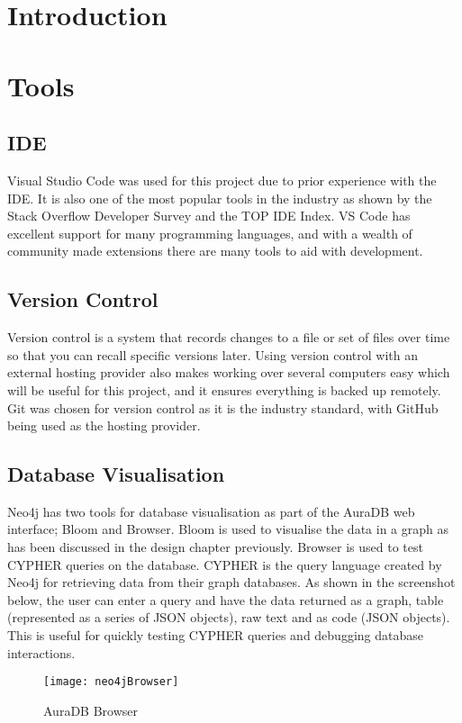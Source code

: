 \section{Introduction}
\section{Tools}
\subsection{IDE}
Visual Studio Code was used for this project due to prior experience with the IDE. It is also one of the most popular tools in the industry 
as shown by the Stack Overflow Developer Survey\cite{StackOverflowDeveloper} and the TOP IDE Index\cite{TOPIDETop}.
VS Code has excellent support for many programming languages, and with a wealth of community made extensions there are many tools to aid with development.
\subsection{Version Control}
Version control is a system that records changes to a file or set of files over time so that you can recall specific versions later.\cite{GitVersionControl}
Using version control with an external hosting provider also makes working over several computers easy which will be useful for this project, and it ensures everything is backed up remotely.
Git was chosen for version control as it is the industry standard, with GitHub being used as the hosting provider.
\subsection{Database Visualisation}
Neo4j has two tools for database visualisation as part of the AuraDB web interface; Bloom and Browser. Bloom is used to 
visualise the data in a graph as has been discussed in the design chapter previously. Browser is used to test CYPHER queries on the database.
CYPHER is the query language created by Neo4j for retrieving data from their graph databases. As shown in the screenshot below, the user can enter a 
query and have the data returned as a graph, table (represented as a series of JSON objects), raw text and as code (JSON objects).
This is useful for quickly testing CYPHER queries and debugging database interactions.
\begin{figure}[h]
    \centering
    \texttt{[image: neo4jBrowser]}
    \caption{AuraDB Browser}
\end{figure}
